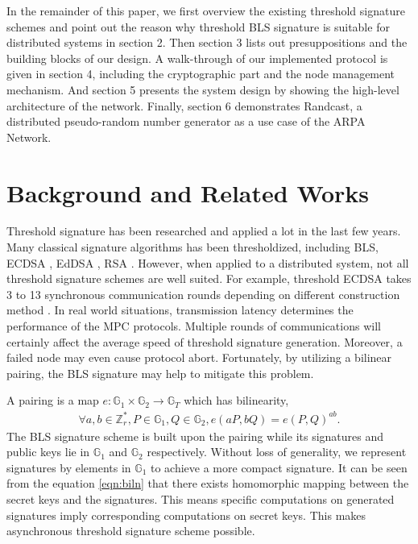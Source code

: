 \documentclass[11pt]{article}
\begin{document}
In the remainder of this paper, we first overview the existing threshold signature schemes and point out the reason why threshold BLS signature is suitable for distributed systems in section 2. Then section 3 lists out presuppositions and the building blocks of our design. A walk-through of our implemented protocol is given in section 4, including the cryptographic part and the node management mechanism. And section 5 presents the system design by showing the high-level architecture of the network. Finally, section 6 demonstrates Randcast, a distributed pseudo-random number generator as a use case of the ARPA Network.

\section{Background and Related Works}

Threshold signature has been researched and applied a lot in the last few years. Many classical signature algorithms has been thresholdized, including BLS, ECDSA \cite{gennaro2018fast}, EdDSA \cite{stinson2001provably}, RSA \cite{damgaard2001practical}. However, when applied to a distributed system, not all threshold signature schemes are well suited. For example, threshold ECDSA takes 3 to 13 synchronous communication rounds depending on different construction method \cite{aumasson2020survey}. In real world situations, transmission latency determines the performance of the MPC protocols. Multiple rounds of communications will certainly affect the average speed of threshold signature generation. Moreover, a failed node may even cause protocol abort. Fortunately, by utilizing a bilinear pairing, the BLS signature may help to mitigate this problem.

A pairing is a map $e:\mathbb{G}_1 \times \mathbb{G}_2 \to \mathbb{G}_T$ which has bilinearity, 
\begin{align}\label{eqn:biln}
    \forall a,b \in \mathbb{Z}_r^*, P \in \mathbb{G}_1, Q \in \mathbb{G}_2, e(aP,bQ)=e(P,Q)^{ab}.
\end{align}
The BLS signature scheme is built upon the pairing while its signatures and public keys lie in $\mathbb{G}_1$ and $\mathbb{G}_2$ respectively. Without loss of generality, we represent signatures by elements in $\mathbb{G}_1$ to achieve a more compact signature. It can be seen from the equation \ref{eqn:biln} that there exists homomorphic mapping between the secret keys and the signatures. This means specific computations on generated signatures imply corresponding computations on secret keys. This makes asynchronous threshold signature scheme possible.
\end{document}
